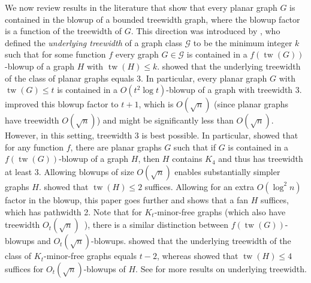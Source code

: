 \documentclass{patmorin}
\renewcommand{\le}{\leqslant}
\renewcommand{\leq}{\leqslant}
\newcommand{\david}[1]{{\color{orange} David: #1}}
\newcommand{\pat}[1]{\textcolor{Blue}{Pat: #1}}
\newcommand{\defin}[1]{\emph{\textcolor{brightmaroon}{#1}}}
\DeclareMathOperator{\tw}{tw}
\newcommand{\GG}{\mathcal{G}}
\begin{document}
We now review results in the literature that show that every planar graph $G$ is contained in the blowup of a bounded treewidth graph, where the blowup factor is a function of the treewidth of $G$. This direction was introduced by \citet{UTW}, who defined the \defin{underlying treewidth} of a graph class $\GG$ to be the minimum integer $k$ such that for some function $f$ every graph $G\in\GG$ is contained in a $f(\tw(G))$-blowup of a graph $H$ with $\tw(H)\leq k$. \citet{UTW} showed that the underlying treewidth of the class of planar graphs equals 3. In particular, every planar graph $G$ with $\tw(G)\leq t$ is contained in a $O(t^2\log t)$-blowup of a graph with treewidth 3. \citet{ISW} improved this blowup factor to $t+1$, which is $O(\sqrt{n})$ (since planar graphs have treewidth $O(\sqrt{n})$) and might be significantly less than $O(\sqrt{n})$.  However, in this setting, treewidth 3 is best possible. In particular, \citet{UTW} showed that for any function $f$, there are planar graphs $G$ such that if $G$ is contained in a $f(\tw(G))$-blowup of a graph $H$, then $H$ contains $K_4$ and thus has treewidth at least 3. Allowing blowups of size $O(\sqrt{n})$ enables substantially simpler graphs $H$. \citet{distel.dujmovic.ea:product} showed that $\tw(H)\leq 2$ suffices. Allowing for an extra $O(\log^2n)$ factor in the blowup, this paper goes further and shows that a fan $H$ suffices, which has pathwidth 2. Note that for $K_t$-minor-free graphs (which also have treewidth $O_t(\sqrt{n})$~\citep{AST90}), there is a similar distinction between $f(\tw(G))$-blowups and $O_t(\sqrt{n})$-blowups. \citet{UTW} showed that the underlying treewidth of the class of $K_t$-minor-free graphs equals $t-2$, whereas
\citet{distel.dujmovic.ea:product} showed that $\tw(H)\leq 4$ suffices for $O_t(\sqrt{n})$-blowups of $H$. See \citep{DHHJLMMRW} for more results on underlying treewidth.


\end{document}
